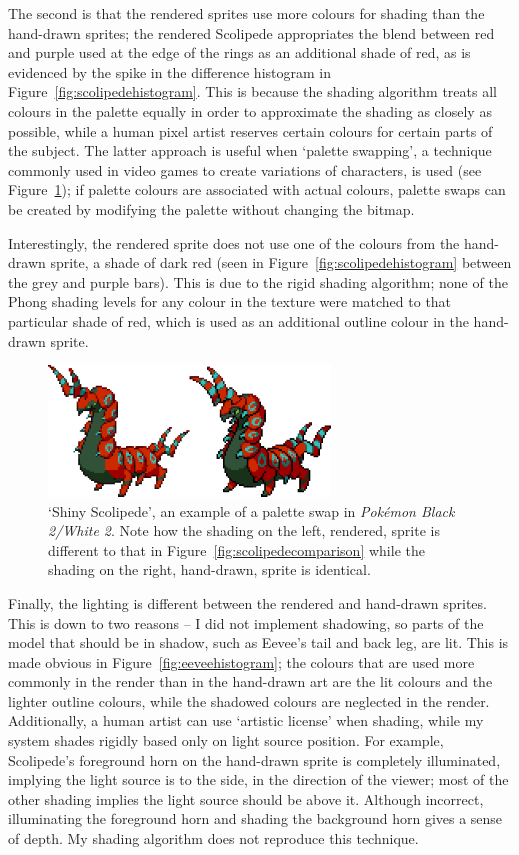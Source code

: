 \documentclass[12pt,twoside,notitlepage]{report}
\begin{document}
The second is that the rendered sprites use more colours for shading than the hand-drawn sprites; the rendered Scolipede appropriates the blend between red and purple used at the edge of the rings as an additional shade of red, as is evidenced by the spike in the difference histogram in Figure~\ref{fig:scolipedehistogram}. This is because the shading algorithm treats all colours in the palette equally in order to approximate the shading as closely as possible, while a human pixel artist reserves certain colours for certain parts of the subject. The latter approach is useful when `palette swapping', a technique commonly used in video games to create variations of characters, is used (see Figure~\ref{fig:shinyscolipede}); if palette colours are associated with actual colours, palette swaps can be created by modifying the palette without changing the bitmap.

Interestingly, the rendered sprite does not use one of the colours from the hand-drawn sprite, a shade of dark red (seen in Figure~\ref{fig:scolipedehistogram} between the grey and purple bars). This is due to the rigid shading algorithm; none of the Phong shading levels for any colour in the texture were matched to that particular shade of red, which is used as an additional outline colour in the hand-drawn sprite.

\begin{figure}[h!]
\centering
\includegraphics[width=0.667\textwidth]{shinyscolipede}
\caption{`Shiny Scolipede', an example of a palette swap in \textit{Pok\'{e}mon Black 2/White 2}. Note how the shading on the left, rendered, sprite is different to that in Figure~\ref{fig:scolipedecomparison} while the shading on the right, hand-drawn, sprite is identical.}
\label{fig:shinyscolipede}
\end{figure}

Finally, the lighting is different between the rendered and hand-drawn sprites. This is down to two reasons -- I did not implement shadowing, so parts of the model that should be in shadow, such as Eevee's tail and back leg, are lit. This is made obvious in Figure~\ref{fig:eeveehistogram}; the colours that are used more commonly in the render than in the hand-drawn art are the lit colours and the lighter outline colours, while the shadowed colours are neglected in the render. Additionally, a human artist can use `artistic license' when shading, while my system shades rigidly based only on light source position. For example, Scolipede's foreground horn on the hand-drawn sprite is completely illuminated, implying the light source is to the side, in the direction of the viewer; most of the other shading implies the light source should be above it. Although incorrect, illuminating the foreground horn and shading the background horn gives a sense of depth. My shading algorithm does not reproduce this technique.
\end{document}

